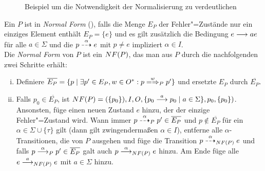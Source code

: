 \begin{figure}[htbp]
  \begin{center}
    \caption{Beispiel um die Notwendigkeit der Normalisierung zu verdeutlichen}
    \label{BspKreuzpConj}
  \end{center}
\end{figure}

\begin{Def}
  \label{normalFormDef}
  Ein \MEIO{} $P$ ist in \emph{Normal Form} (\NF{}), falls die Menge $E_P$ der
  Fehler"=Zustände nur ein einziges Element enthält $E_P=\{e\}$ und es gilt
  zusätzlich die Bedingung $e \must{a} e$ für alle $a\in\Sigma$ und die $p
  \may[\alpha] e$ mit $p\neq e$ impliziert $\alpha\in I$.\\
  Die \emph{Normal Form} von $P$ ist ein \MEIO{} $NF (P)$, das man aus $P$
  durch die nachfolgenden zwei Schritte erhält:
  \begin{enumerate}[(i)]
    \item Definiere $\overline{E_P} = \{p \mid \exists p'\in E_P, w\in O^*:
      p\weakmay[w]_P p'\}$ und ersetzte $E_P$ durch $\overline{E_P}$.
    \item Falls $p_0\in \overline{E_P}$, ist $NF(P) = (\{p_0\}), I, O, \{p_0
      \must[a] p_0 \mid a\in\Sigma\}, p_0, \{p_0\})$.\\
      Ansonsten, füge einen neuen Zustand $e$ hinzu, der der einzige
      Fehler"=Zustand wird. Wann immer $p \may[\alpha]_P p'\in \overline{E_P}$
      und $p\notin \overline{E_P}$ für ein $\alpha\in \Sigma \cup \{\tau\}$
      gilt (dann gilt zwingendermaßen $\alpha \in I$), entferne alle
      $\alpha$-Transitionen, die von $P$ ausgehen und füge die Transition
      $p\may[\alpha]_{\NF (P)} e$ und falls $p \must[\alpha]_P p'\in
      \overline{E_P}$ galt auch $p \must[\alpha]_{\NF (P)} e$ hinzu. Am Ende
      füge alle $e\must[a]_{\NF (P)} e$ mit $a\in\Sigma$ hinzu.
  \end{enumerate}
\end{Def}

